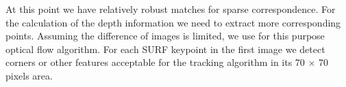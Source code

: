 

At this point we have relatively robust matches for sparse correspondence. 
For the calculation of the depth information we need to extract more corresponding points.
Assuming the difference of images is limited, we use for this purpose optical flow algorithm. 
For each SURF keypoint in the first image we detect corners or other features acceptable for the tracking algorithm in its 70 $\times$ 70 pixels area.

